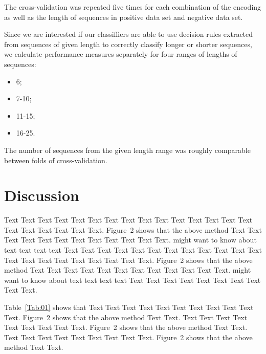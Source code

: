 \documentclass{bioinfo}
\begin{document}
\begin{methods}
The cross-validation was repeated five times for each combination of the encoding as well as the length of sequences in positive data set and negative data set.

Since we are interested if our classiffiers are able to use decision rules extracted from sequences of given length to correctly classify longer or shorter sequences, we calculate performance measures separately for four ranges of lengths of sequences:  
\begin{itemize}
\item 6;  
\item 7-10;   
\item 11-15;   
\item 16-25.  
\end{itemize}
The number of sequences from the given length range was roughly comparable between folds of cross-validation.


\section{Discussion}

Text Text Text Text Text Text  Text Text Text Text Text Text Text
Text Text  Text Text Text Text Text Text.
Figure~2\vphantom{\ref{fig:02}} shows that the above method  Text
Text Text Text  Text Text Text Text Text Text  Text Text.
\citealp{Boffelli03} might want to know about  text text text text
Text Text Text Text Text Text  Text Text Text Text Text Text Text
Text Text  Text Text Text Text Text Text.
Figure~2\vphantom{\ref{fig:02}} shows that the above method  Text
Text Text Text  Text Text Text Text Text Text  Text Text.
\citealp{Boffelli03} might want to know about  text text text text
Text Text Text Text Text Text Text Text Text Text.




Table~\ref{Tab:01} shows that Text Text Text Text Text  Text Text
Text Text Text Text. Figure~2\vphantom{\ref{fig:02}} shows that
the above method Text Text. Text Text Text  Text Text Text Text
Text Text. Figure~2\vphantom{\ref{fig:02}} shows that the above
method Text Text. Text Text Text  Text Text Text Text Text Text.
Figure~2\vphantom{\ref{fig:02}} shows that the above method Text
Text.









%
%







\end{methods}
\end{document}
